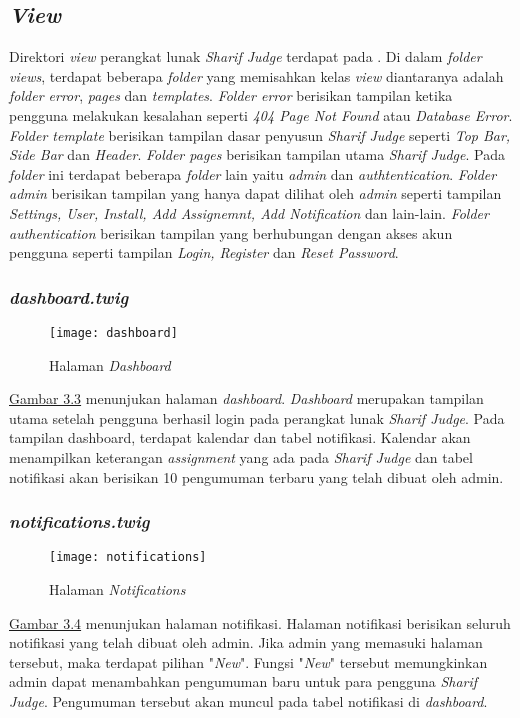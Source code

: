 \subsection{\textit{View}}
Direktori \textit{view} perangkat lunak \textit{Sharif Judge} terdapat pada . Di dalam \textit{folder views}, terdapat beberapa \textit{folder} yang memisahkan kelas \textit{view} diantaranya adalah \textit{folder error}, \textit{pages} dan \textit{templates}. \textit{Folder error} berisikan tampilan ketika pengguna melakukan kesalahan seperti\textit{ 404 Page Not Found} atau \textit{Database Error}. \textit{Folder template} berisikan tampilan dasar penyusun \textit{Sharif Judge} seperti \textit{Top Bar, Side Bar} dan \textit{Header}. \textit{Folder pages} berisikan tampilan utama \textit{\textit{Sharif Judge}}. Pada \textit{folder} ini terdapat beberapa \textit{folder} lain yaitu \textit{admin} dan \textit{authtentication}. \textit{Folder admin} berisikan tampilan yang hanya dapat dilihat oleh \textit{admin} seperti tampilan \textit{Settings, User, Install, Add Assignemnt, Add Notification} dan lain-lain. \textit{Folder authentication} berisikan tampilan yang berhubungan dengan akses akun pengguna seperti tampilan \textit{Login, Register} dan \textit{Reset Password}.

\subsubsection{\textit{dashboard.twig}}
\begin{figure}[H]
	\centering  
	\texttt{[image: dashboard]}  
	\caption[Halaman \textit{Dashboard}]{Halaman \textit{Dashboard}} 
	\label{fig:dashboard} 
\end{figure} 
\hyperref[fig:dashboard]{Gambar 3.3} menunjukan halaman \textit{dashboard}. \textit{Dashboard} merupakan tampilan utama setelah pengguna berhasil login pada perangkat lunak \textit{Sharif Judge}. Pada tampilan dashboard, terdapat kalendar dan tabel notifikasi. Kalendar akan menampilkan keterangan \textit{assignment} yang ada pada \textit{Sharif Judge} dan tabel notifikasi akan berisikan 10 pengumuman terbaru yang telah dibuat oleh admin.

\subsubsection{\textit{notifications.twig}}
\begin{figure}[H]
	\centering  
	\texttt{[image: notifications]}  
	\caption[Halaman \textit{Notifications}]{Halaman \textit{Notifications}} 
	\label{fig:notifications} 
\end{figure} 
\hyperref[fig:notifications]{Gambar 3.4} menunjukan halaman notifikasi. Halaman notifikasi berisikan seluruh notifikasi yang telah dibuat oleh admin. Jika admin yang memasuki halaman tersebut, maka terdapat pilihan "\textit{New}". Fungsi "\textit{New}" tersebut memungkinkan admin dapat menambahkan pengumuman baru untuk para pengguna \textit{Sharif Judge}. Pengumuman tersebut akan muncul pada tabel notifikasi di \textit{dashboard}.

